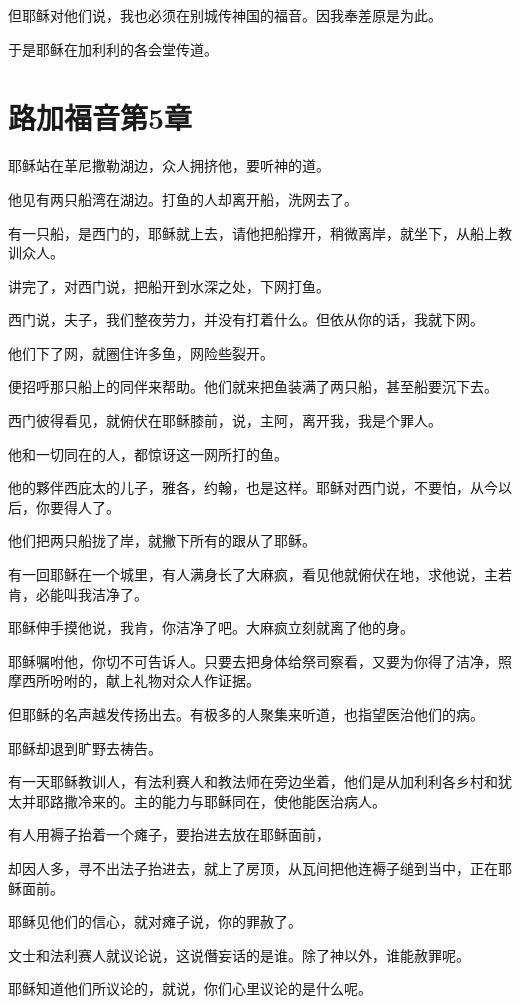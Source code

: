 \documentclass[12pt,oneside]{book}
\begin{document}
但耶稣对他们说，我也必须在别城传神国的福音。因我奉差原是为此。

于是耶稣在加利利的各会堂传道。

\chapter{路加福音第5章}
耶稣站在革尼撒勒湖边，众人拥挤他，要听神的道。

他见有两只船湾在湖边。打鱼的人却离开船，洗网去了。

有一只船，是西门的，耶稣就上去，请他把船撑开，稍微离岸，就坐下，从船上教训众人。

讲完了，对西门说，把船开到水深之处，下网打鱼。

西门说，夫子，我们整夜劳力，并没有打着什么。但依从你的话，我就下网。

他们下了网，就圈住许多鱼，网险些裂开。

便招呼那只船上的同伴来帮助。他们就来把鱼装满了两只船，甚至船要沉下去。

西门彼得看见，就俯伏在耶稣膝前，说，主阿，离开我，我是个罪人。

他和一切同在的人，都惊讶这一网所打的鱼。

他的夥伴西庇太的儿子，雅各，约翰，也是这样。耶稣对西门说，不要怕，从今以后，你要得人了。

他们把两只船拢了岸，就撇下所有的跟从了耶稣。

有一回耶稣在一个城里，有人满身长了大麻疯，看见他就俯伏在地，求他说，主若肯，必能叫我洁净了。

耶稣伸手摸他说，我肯，你洁净了吧。大麻疯立刻就离了他的身。

耶稣嘱咐他，你切不可告诉人。只要去把身体给祭司察看，又要为你得了洁净，照摩西所吩咐的，献上礼物对众人作证据。

但耶稣的名声越发传扬出去。有极多的人聚集来听道，也指望医治他们的病。

耶稣却退到旷野去祷告。

有一天耶稣教训人，有法利赛人和教法师在旁边坐着，他们是从加利利各乡村和犹太并耶路撒冷来的。主的能力与耶稣同在，使他能医治病人。

有人用褥子抬着一个瘫子，要抬进去放在耶稣面前，

却因人多，寻不出法子抬进去，就上了房顶，从瓦间把他连褥子缒到当中，正在耶稣面前。

耶稣见他们的信心，就对瘫子说，你的罪赦了。

文士和法利赛人就议论说，这说僭妄话的是谁。除了神以外，谁能赦罪呢。

耶稣知道他们所议论的，就说，你们心里议论的是什么呢。
\end{document}
